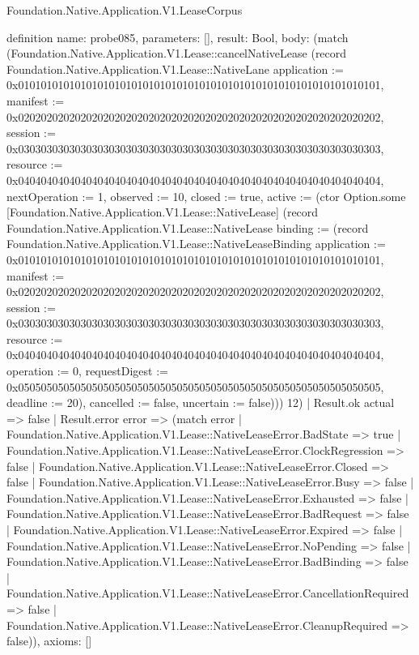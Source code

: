 \begin{lexlean}{Foundation.Native.Application.V1.LeaseCorpus}
\begin{semanticmodule}
definition{
  name: probe085,
  parameters: [],
  result: Bool,
  body: (match (Foundation.Native.Application.V1.Lease::cancelNativeLease (record Foundation.Native.Application.V1.Lease::NativeLane {application := 0x0101010101010101010101010101010101010101010101010101010101010101, manifest := 0x0202020202020202020202020202020202020202020202020202020202020202, session := 0x0303030303030303030303030303030303030303030303030303030303030303, resource := 0x0404040404040404040404040404040404040404040404040404040404040404, nextOperation := 1, observed := 10, closed := true, active := (ctor Option.some [Foundation.Native.Application.V1.Lease::NativeLease] (record Foundation.Native.Application.V1.Lease::NativeLease {binding := (record Foundation.Native.Application.V1.Lease::NativeLeaseBinding {application := 0x0101010101010101010101010101010101010101010101010101010101010101, manifest := 0x0202020202020202020202020202020202020202020202020202020202020202, session := 0x0303030303030303030303030303030303030303030303030303030303030303, resource := 0x0404040404040404040404040404040404040404040404040404040404040404, operation := 0, requestDigest := 0x0505050505050505050505050505050505050505050505050505050505050505, deadline := 20}), cancelled := false, uncertain := false}))}) 12)
    | Result.ok actual => false
    | Result.error error => (match error
      | Foundation.Native.Application.V1.Lease::NativeLeaseError.BadState => true
      | Foundation.Native.Application.V1.Lease::NativeLeaseError.ClockRegression => false
      | Foundation.Native.Application.V1.Lease::NativeLeaseError.Closed => false
      | Foundation.Native.Application.V1.Lease::NativeLeaseError.Busy => false
      | Foundation.Native.Application.V1.Lease::NativeLeaseError.Exhausted => false
      | Foundation.Native.Application.V1.Lease::NativeLeaseError.BadRequest => false
      | Foundation.Native.Application.V1.Lease::NativeLeaseError.Expired => false
      | Foundation.Native.Application.V1.Lease::NativeLeaseError.NoPending => false
      | Foundation.Native.Application.V1.Lease::NativeLeaseError.BadBinding => false
      | Foundation.Native.Application.V1.Lease::NativeLeaseError.CancellationRequired => false
      | Foundation.Native.Application.V1.Lease::NativeLeaseError.CleanupRequired => false)),
  axioms: []
}


\end{semanticmodule}
\end{lexlean}
